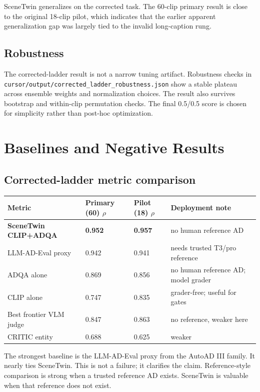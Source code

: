 \documentclass[10pt,twocolumn]{article}
\begin{document}
SceneTwin generalizes on the corrected task. The 60-clip primary result is close to the original 18-clip pilot, which indicates that the earlier apparent generalization gap was largely tied to the invalid long-caption rung.


\subsection{Robustness}

The corrected-ladder result is not a narrow tuning artifact. Robustness checks in \texttt{cursor/output/corrected\_ladder\_robustness.json} show a stable plateau across ensemble weights and normalization choices. The result also survives bootstrap and within-clip permutation checks. The final 0.5/0.5 score is chosen for simplicity rather than post-hoc optimization.


\section{Baselines and Negative Results}


\subsection{Corrected-ladder metric comparison}

\begin{table}[t]
\centering
\small
\begin{tabular}{@{}llll@{}}
\toprule
Metric & Primary (60) $\rho$ & Pilot (18) $\rho$ & Deployment note \\
\midrule
\textbf{SceneTwin CLIP+ADQA} & \textbf{0.952} & \textbf{0.957} & no human reference AD \\
LLM-AD-Eval proxy & 0.942 & 0.941 & needs trusted T3/pro reference \\
ADQA alone & 0.869 & 0.856 & no human reference AD; model grader \\
CLIP alone & 0.747 & 0.835 & grader-free; useful for gates \\
Best frontier VLM judge & 0.847 & 0.863 & no reference, weaker here \\
CRITIC entity & 0.688 & 0.625 & weaker \\
\bottomrule
\end{tabular}
\end{table}

The strongest baseline is the LLM-AD-Eval proxy from the AutoAD III family. It nearly ties SceneTwin. This is not a failure; it clarifies the claim. Reference-style comparison is strong when a trusted reference AD exists. SceneTwin is valuable when that reference does not exist.
\end{document}
